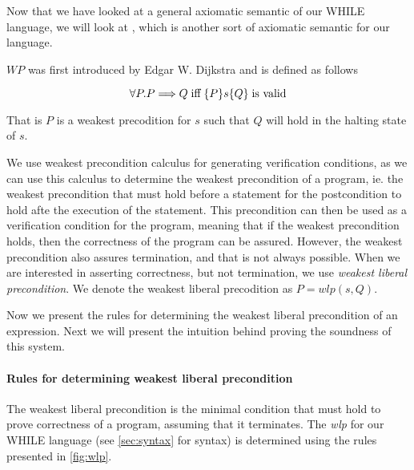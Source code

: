 Now that we have looked at a general axiomatic semantic of our WHILE language, we will look at , which is another sort of axiomatic semantic for our language.

$WP$ was first introduced by Edgar W. Dijkstra and is defined as follows

$$
\forall P. P \Longrightarrow Q \; \text{iff} \; \{P\}s\{Q\} \; \text{is valid}
$$

That is $P$ is a weakest precodition for $s$ such that $Q$ will hold in the halting state of $s$.

We use weakest precondition calculus for generating verification conditions, as we can use
this calculus to determine the weakest precondition of a program, ie. the weakest precondition
that must hold before a statement for the postcondition to hold afte the execution of the statement.
This precondition can then be used as a verification condition for the program, meaning that if the weakest precondition holds, then the correctness of the program can be assured.
However, the weakest precondition also assures termination, and that is not always possible. When we are interested in asserting correctness, but not termination, we use \textit{weakest liberal precondition}.
We denote the weakest liberal precodition as $P = wlp(s,Q)$.

Now we present the rules for determining the weakest liberal precondition of an expression.
Next we will present the intuition behind proving the soundness of this system.

\paragraph{Rules for determining weakest liberal precondition}
The weakest liberal precondition is the minimal condition that must hold to prove correctness of a program, assuming that it terminates.
The \textit{wlp} for our WHILE language (see \ref{sec:syntax} for syntax) is determined using the rules presented in \autoref{fig:wlp}.

